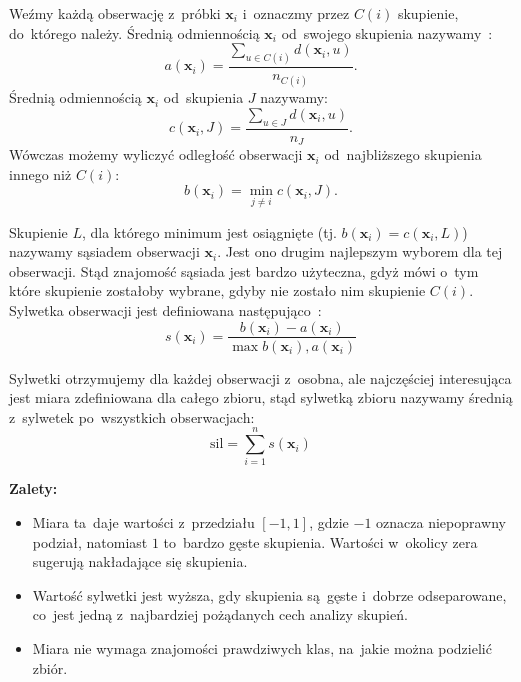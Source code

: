 \documentclass{praca1}
\begin{document}
Weźmy każdą obserwację z~próbki $\mathbf{x}_i$ i~oznaczmy przez $C(i)$ skupienie, do~którego należy. Średnią odmiennością $\mathbf{x}_i$ od~swojego skupienia nazywamy~\cite{Rousseeuw1987:silhoutte}:
\begin{equation*}
a(\mathbf{x}_i) = \frac{\sum_{u \in C(i)} d(\mathbf{x}_i, u)}{n_{C(i)}}.
\end{equation*}
Średnią odmiennością $\mathbf{x}_i$ od~skupienia $J$ nazywamy:
\begin{equation*}
c(\mathbf{x}_i, J) = \frac{\sum_{u \in J} d(\mathbf{x}_i, u)}{n_{J}}.
\end{equation*}
Wówczas możemy wyliczyć odległość obserwacji $\mathbf{x}_i$ od~najbliższego skupienia innego niż $C(i)$:
\begin{equation*}
b(\mathbf{x}_i) = \min\limits_{j \neq i} c(\mathbf{x}_i, J).
\end{equation*}

Skupienie $L$, dla którego minimum jest osiągnięte (tj. $b(\mathbf{x}_i) = c(\mathbf{x}_i, L)$) nazywamy sąsiadem obserwacji $\mathbf{x}_i$. Jest ono drugim najlepszym wyborem dla tej obserwacji. Stąd znajomość sąsiada jest bardzo użyteczna, gdyż mówi o~tym które skupienie zostałoby wybrane, gdyby nie zostało nim skupienie $C(i)$. Sylwetka obserwacji jest definiowana następująco~\cite{Rousseeuw1987:silhoutte}:
\begin{equation*}
s(\mathbf{x}_i) = \frac{b(\mathbf{x}_i) - a(\mathbf{x}_i)}{\max{b(\mathbf{x}_i), a(\mathbf{x}_i)}}
\end{equation*}

Sylwetki otrzymujemy dla każdej obserwacji z~osobna, ale najczęściej interesująca jest miara zdefiniowana dla całego zbioru, stąd sylwetką zbioru nazywamy średnią z~sylwetek po~wszystkich obserwacjach:
\begin{equation*}
\mathrm{sil} = \sum\limits_{i=1}^{n}s(\mathbf{x}_i)
\end{equation*}

\textbf{Zalety:}
\begin{itemize}
\item Miara ta~daje wartości z~przedziału $[-1, 1]$, gdzie $-1$ oznacza niepoprawny podział, natomiast $1$ to~bardzo gęste skupienia. Wartości w~okolicy zera sugerują nakładające się skupienia.
\item Wartość sylwetki jest wyższa, gdy skupienia są~gęste i~dobrze odseparowane, co~jest jedną z~najbardziej pożądanych cech analizy skupień.
\item Miara nie wymaga znajomości prawdziwych klas, na~jakie można podzielić zbiór.
\end{itemize}
\end{document}
